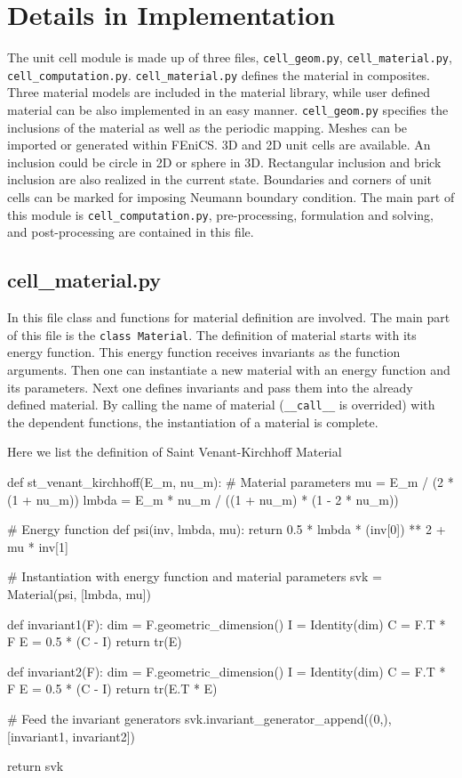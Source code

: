 \documentclass[10pt,a4paper]{scrreprt}
\begin{document}

\section{Details in Implementation}
The unit cell module is made up of three files, \texttt{cell\_geom.py}, \texttt{cell\_material.py}, \texttt{cell\_computation.py}. \texttt{cell\_material.py} defines the material in composites. Three material models are included in the material library, while user defined material can be also implemented in an easy manner. \texttt{cell\_geom.py} specifies the inclusions of the material as well as the periodic mapping. Meshes can be imported or generated within FEniCS. 3D and 2D unit cells are available. An inclusion could be circle in 2D or sphere in 3D. Rectangular inclusion and brick inclusion are also realized in the current state. Boundaries and corners of unit cells can be marked for imposing Neumann boundary condition. The main part of this module is \texttt{cell\_computation.py}, pre-processing, formulation and solving, and post-processing are contained in this file. 

\subsection{cell\_material.py}
In this file class and functions for material definition are involved. The main part of this file is the \texttt{class Material}. The definition of material starts with its energy function. This energy function receives invariants as the function arguments. Then one can instantiate a new material with an energy function and its parameters. Next one defines invariants and pass them into the already defined material. By calling the name of material (\texttt{\_\_call\_\_} is overrided) with the dependent functions, the instantiation of a material is complete.

Here we list the definition of Saint Venant-Kirchhoff Material

\begin{python}
def st_venant_kirchhoff(E_m, nu_m):
	# Material parameters
    mu = E_m / (2 * (1 + nu_m))
    lmbda = E_m * nu_m / ((1 + nu_m) * (1 - 2 * nu_m))

	# Energy function
    def psi(inv, lmbda, mu):
        return 0.5 * lmbda * (inv[0]) ** 2 + mu * inv[1]

	# Instantiation with energy function and material parameters
    svk = Material(psi, [lmbda, mu])

    def invariant1(F):
        dim = F.geometric_dimension()
        I = Identity(dim)
        C = F.T * F
        E = 0.5 * (C - I)
        return tr(E)

    def invariant2(F):
        dim = F.geometric_dimension()
        I = Identity(dim)
        C = F.T * F
        E = 0.5 * (C - I)
        return tr(E.T * E)
	
	# Feed the invariant generators
    svk.invariant_generator_append((0,), [invariant1, invariant2])

    return svk
\end{python}
\end{document}
